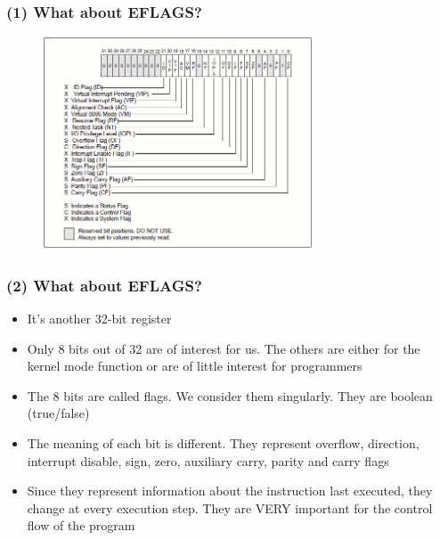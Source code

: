 \documentclass[]{beamer}
\begin{document}
		\begin{frame}
			\frametitle{(1) What about EFLAGS?}
			\begin{figure}
				\includegraphics[height=2.5in]{images/eflags.jpeg}
				\label{Eflags idea}
			\end{figure}
		\end{frame}
		\begin{frame}
			\frametitle{(2) What about EFLAGS?}
			\begin{itemize}
				\item{It's another 32-bit register}
				\item{Only 8 bits out of 32 are of interest for us. The others are either for the kernel mode function or  are of little interest for programmers}
				\item{The 8 bits are called flags. We consider them singularly. They are boolean (true/false) }
				\item{The meaning of each bit is different. They represent overflow, direction, interrupt disable, sign, zero, auxiliary carry, parity and carry flags}
				\item{Since they represent information about the instruction last executed, they change at every execution step. They are VERY important for the control flow of the program }				
			\end{itemize}
		\end{frame}
\end{document}
